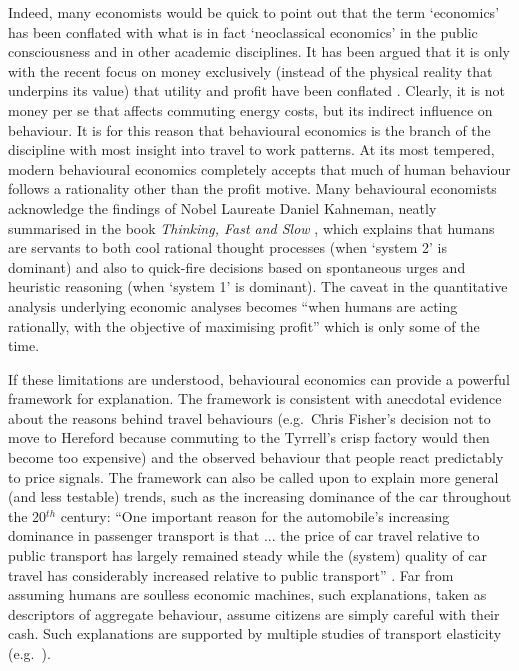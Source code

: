 Indeed, many economists would be quick to point out that the term `economics'
has been conflated with what is in fact `neoclassical economics' in the public
consciousness and in other academic disciplines.
It has been argued that it is only with the recent
focus on money exclusively (instead of the physical reality that underpins
its value) that utility and profit have been conflated \citep{porritt2007capitalism,
Eisenstein2011}.
Clearly, it is not money per se that affects commuting energy costs, but
its indirect influence on behaviour. It is for this
reason that behavioural economics is the
branch of the discipline with most insight into travel to work patterns.
At its most tempered, modern behavioural economics completely accepts that much
of human behaviour follows a rationality other than the profit
motive. Many behavioural economists acknowledge the findings of Nobel
Laureate Daniel Kahneman, neatly summarised in the
book \emph{Thinking, Fast and Slow} \citep{Kahneman2012}, which
explains that humans are servants to both cool rational thought processes
(when `system 2' is dominant) and also to quick-fire decisions based on
spontaneous urges and heuristic reasoning (when `system 1' is dominant). The
caveat in the quantitative analysis underlying economic analyses
becomes ``when humans are acting
rationally, with the objective of maximising profit'' which is only some of the
time.

If these limitations are understood, behavioural economics can provide a powerful
framework for explanation. The
framework is consistent with anecdotal evidence about the reasons behind travel
behaviours (e.g.~Chris Fisher's decision not to move to Hereford because
commuting to the Tyrrell's crisp factory would then become too expensive) and
the observed behaviour that people react predictably to price signals.
The framework can also be called upon to explain more general (and less
testable) trends, such as the increasing dominance of the car throughout the
20$^{th}$ century: ``One important reason for the automobile's increasing
dominance in passenger transport is that ... the price of car travel relative
to public transport has largely remained steady while the (system) quality of
car travel has considerably increased relative to public transport''
\citep[p.~149]{Exel2011-b-ec}. %
Far from assuming humans are soulless economic machines,
such explanations, taken as descriptors of aggregate behaviour,
assume citizens are simply careful with their cash.
Such explanations are supported by multiple studies of transport elasticity
(e.g.~\citealp{goodwin2004elasticities}).

